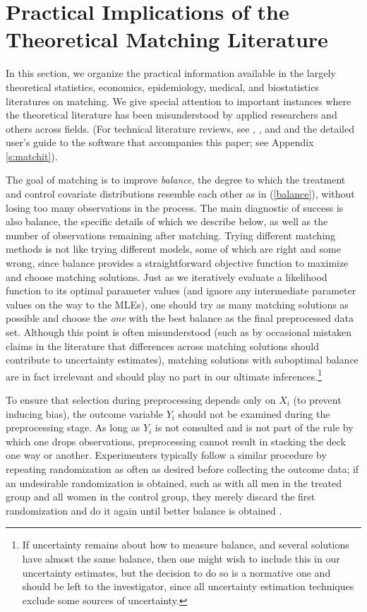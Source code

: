\documentclass[11pt,titlepage]{article}
\begin{document}
\section{Practical Implications of the Theoretical Matching
  Literature}
\label{s:choose}

In this section, we organize the practical information available in
the largely theoretical statistics, economics, epidemiology, medical,
and biostatistics literatures on matching.  We give special attention
to important instances where the theoretical literature has been
misunderstood by applied researchers and others across fields.  (For
technical literature reviews, see \citet{Imbens04},
\citet{Rosenbaum02}, and \citet{Stuart04} and the detailed user's
guide to the software that accompanies this paper; see Appendix
\ref{s:matchit}).

The goal of matching is to improve \emph{balance}, the degree to which
the treatment and control covariate distributions resemble each other
as in (\ref{balance}), without losing too many observations in the
process.  The main diagnostic of success is also balance, the specific
details of which we describe below, as well as the number of
observations remaining after matching.  Trying different matching
methods is not like trying different models, some of which are right
and some wrong, since balance provides a straightforward objective
function to maximize and choose matching solutions.  Just as we
iteratively evaluate a likelihood function to its optimal parameter
values (and ignore any intermediate parameter values on the way to the
MLEs), one should try as many matching solutions as possible and
choose the \emph{one} with the best balance as the final preprocessed
data set.  Although this point is often misunderstood (such as by
occasional mistaken claims in the literature that differences across
matching solutions should contribute to uncertainty estimates),
matching solutions with suboptimal balance are in fact irrelevant and
should play no part in our ultimate inferences.\footnote{If
  uncertainty remains about how to measure balance, and several
  solutions have almost the same balance, then one might wish to
  include this in our uncertainty estimates, but the decision to do so
  is a normative one and should be left to the investigator, since all
  uncertainty estimation techniques exclude some sources of
  uncertainty.}

To ensure that selection during preprocessing depends only on $X_i$
(to prevent inducing bias), the outcome variable $Y_i$ should not be
examined during the preprocessing stage.  As long as $Y_i$ is not
consulted and is not part of the rule by which one drops observations,
preprocessing cannot result in stacking the deck one way or another.
Experimenters typically follow a similar procedure by repeating
randomization as often as desired before collecting the outcome data;
if an undesirable randomization is obtained, such as with all men in
the treated group and all women in the control group, they merely
discard the first randomization and do it again until better balance
is obtained \citep[see][]{Rubin01}.
\end{document}
